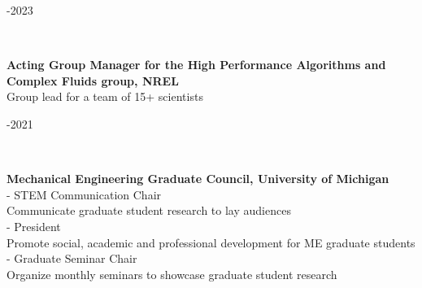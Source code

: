 \documentclass[11pt,letterpaper]{article}
\begin{document}
\begin{minipage}[t]{0.15\textwidth}-2023%
\end{minipage}\\[2ex]%
\begin{minipage}[t]{0.82\textwidth}%
  \textbf{Acting Group Manager for the High Performance Algorithms and Complex Fluids group, NREL}\\%
  Group lead for a team of 15+ scientists%
\end{minipage}\hfill%
\begin{minipage}[t]{0.15\textwidth}-2021%
\end{minipage}\\[2ex]%
\begin{minipage}[t]{0.82\textwidth}%
  \textbf{Mechanical Engineering Graduate Council, University of Michigan}\\%
  - STEM Communication Chair\\%
  \hphantom{-} Communicate graduate student research to lay audiences\\[1ex]%
  - President\\%
  \hphantom{-} Promote social, academic and professional development for ME graduate students\\[1ex]%
  - Graduate Seminar Chair\\%
  \hphantom{-} Organize monthly seminars to showcase graduate student research%
\end{minipage}\hfill%
\end{document}
